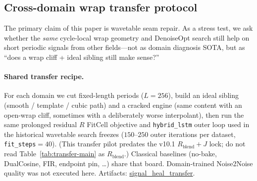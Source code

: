 
\subsection{Cross-domain wrap transfer protocol}
\label{sec:transfer-protocol}

The primary claim of this paper is wavetable seam repair.
As a stress test, we ask whether the \emph{same} cycle-local wrap geometry and DenoiseOpt search
still help on short periodic signals from other fields---not as domain diagnosis SOTA, but as
``does a wrap cliff + ideal sibling still make sense?''

\paragraph{Shared transfer recipe.}
For each domain we cut fixed-length periods ($L{=}256$), build an ideal sibling (smooth / template / cubic path)
and a cracked engine (same content with an open-wrap cliff, sometimes with a deliberately worse interpolant),
then run the same prolonged residual $R$ FitCell objective and \texttt{hybrid\_lstm} outer loop used in the
historical wavetable search freezes
($150$--$250$ outer iterations per dataset, \texttt{fit\_steps}${}={}40$).
(This transfer pilot predates the v10.1 $R_{\mathrm{blend}}{+}J$ lock; do not read Table~\ref{tab:transfer-main} as $R_{\mathrm{blend}}$.)
Classical baselines (no-bake, DualCosine, FIR, endpoint pin, \ldots) share that board.
Domain-trained Noise2Noise quality was not executed here.
Artifacts:
\href{https://github.com/reeldemo/reelsynth/tree/main/brand/artifacts/signal_heal_transfer}{signal\_heal\_transfer}.


